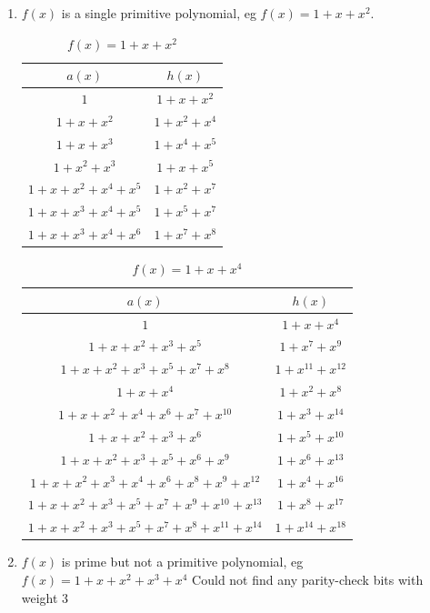 \documentclass[11pt, oneside, dvipdfmx]{book}
\begin{document}
\begin{enumerate}
\item $f(x)$ is a single primitive polynomial, eg $f(x)=1+x+x^2$.
\begin{table}[h!]
 \caption{$f(x)=1+x+x^2$}
\centering
 \begin{tabular}{c c} 
 \hline
 $a(x)$ & $h(x)$ \\ [0.5ex] 
 \hline\hline
$1$ & $1+x+x^2$\\
\hline
$1+x+x^2$  & $1+x^2+x^4$\\
\hline
$1+x+x^3$  & $1+x^4+x^5$\\
\hline
$1+x^2+x^3$  & $1+x+x^5$\\
\hline
$1+x+x^2+x^4+x^5$  & $1+x^2+x^7$\\
\hline
$1+x+x^3+x^4+x^5$  & $1+x^5+x^7$\\
\hline
$1+x+x^3+x^4+x^6$  & $1+x^7+x^8$\\
 \end{tabular}
 \label{Tab7a}
\end{table}

\begin{table}[h!]
 \caption{$f(x)=1+x+x^4$}
\centering
 \begin{tabular}{c c} 
 \hline
 $a(x)$ & $h(x)$ \\ [0.5ex] 
 \hline\hline
$1$ & $1+x+x^4$\\
\hline
$1+x+x^2+x^3+x^5$  & $1+x^7+x^9$\\
\hline
$1+x+x^2+x^3+x^5+x^7+x^8$  & $1+x^{11}+x^{12}$\\
\hline
$1+x+x^4$  & $1+x^{2}+x^{8}$\\
\hline
$1+x+x^2+x^4+x^6+x^7+x^{10}$  & $1+x^3+x^{14}$\\
\hline
$1+x+x^2+x^3+x^6$  & $1+x^5+x^{10}$\\
\hline
$1+x+x^2+x^3+x^5+x^6+x^9$  & $1+x^{6}+x^{13}$\\
\hline
$1+x+x^2+x^3+x^4+x^6+x^8+x^9+x^{12}$  & $1+x^4+x^{16}$\\
\hline
$1+x+x^2+x^3+x^5+x^7+x^9+x^{10}+x^{13}$  & $1+x^8+x^{17}$\\
\hline
$1+x+x^2+x^3+x^5+x^7+x^8+x^{11}+x^{14}$  & $1+x^{14}+x^{18}$\\
 \end{tabular}
 \label{Tab7b}
\end{table}


\item $f(x)$ is prime but not a primitive polynomial, eg $f(x)=1+x+x^2+x^3+x^4$
Could not find any parity-check bits with weight 3


\end{enumerate}
\end{document}
